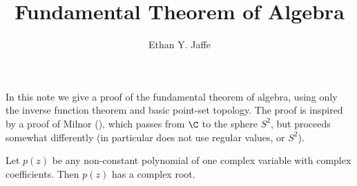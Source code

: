 \documentclass[12pt]{article}
\title{Fundamental Theorem of Algebra}
\author{Ethan Y. Jaffe}
\date{}
\begin{document}
\maketitle


In this note we give a proof of the fundamental theorem of algebra, using only the inverse function theorem and basic point-set topology. The proof is inspired by a proof of Milnor (\cite{Mil}), which passes from $\C$ to the sphere $S^2$, but proceeds somewhat differently (in particular does not use regular values, or $S^2$).

\begin{thm}Let $p(z)$ be any non-constant polynomial of one complex variable with complex coefficients. Then $p(z)$ has a complex root.\end{thm}
\end{document}
